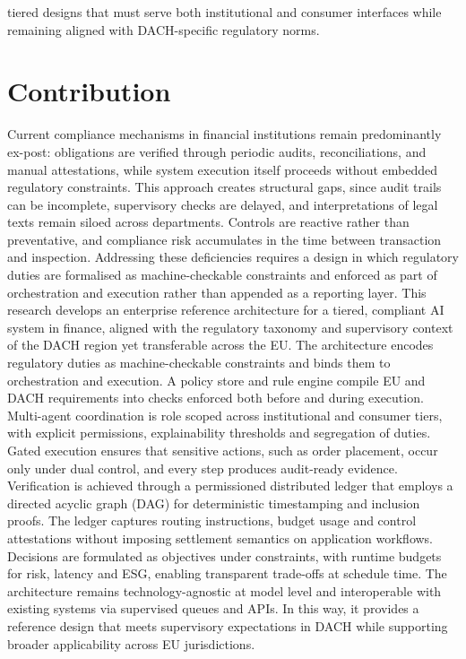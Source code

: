 \documentclass[oneside,10pt]{swissi}
\begin{document}
tiered designs that must serve both institutional and consumer interfaces while remaining aligned with DACH-specific regulatory norms.

\section{Contribution}

Current compliance mechanisms in financial institutions remain predominantly ex-post: obligations are verified through periodic audits, reconciliations, and manual attestations, while system execution itself proceeds without embedded regulatory constraints. This approach creates structural gaps, since audit trails can be incomplete, supervisory checks are delayed, and interpretations of legal texts remain siloed across departments. Controls are reactive rather than preventative, and compliance risk accumulates in the time between transaction and inspection. Addressing these deficiencies requires a design in which regulatory duties are formalised as machine-checkable constraints and enforced as part of orchestration and execution rather than appended as a reporting layer. This research develops an enterprise reference architecture for a tiered, compliant AI system in finance, aligned with the regulatory taxonomy and supervisory context of the DACH region yet transferable across the EU. The architecture encodes regulatory duties as machine-checkable constraints and binds them to orchestration and execution. A policy store and rule engine compile EU and DACH requirements into checks enforced both before and during execution. Multi-agent coordination is role scoped across institutional and consumer tiers, with explicit permissions, explainability thresholds and segregation of duties. Gated execution ensures that sensitive actions, such as order placement, occur only under dual control, and every step produces audit-ready evidence. Verification is achieved through a permissioned distributed ledger that employs a directed acyclic graph (DAG) for deterministic timestamping and inclusion proofs. The ledger captures routing instructions, budget usage and control attestations without imposing settlement semantics on application workflows. Decisions are formulated as objectives under constraints, with runtime budgets for risk, latency and ESG, enabling transparent trade-offs at schedule time. The architecture remains technology-agnostic at model level and interoperable with existing systems via supervised queues and APIs. In this way, it provides a reference design that meets supervisory expectations in DACH while supporting broader applicability across EU jurisdictions.
\end{document}
